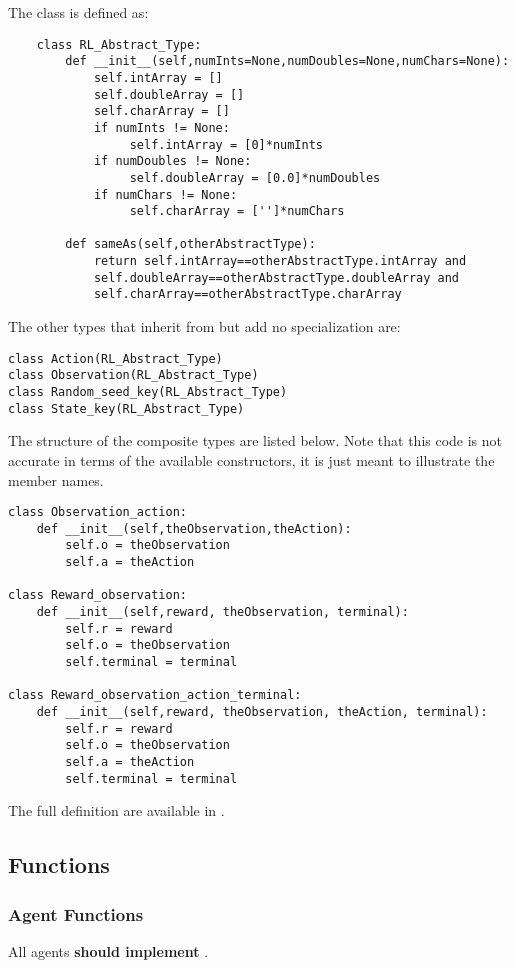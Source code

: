 \documentclass[11pt]{article}
\begin{document}
The class is defined as:
\begin{verbatim}
    class RL_Abstract_Type:
        def __init__(self,numInts=None,numDoubles=None,numChars=None):
            self.intArray = []
            self.doubleArray = []
            self.charArray = []
            if numInts != None:
                 self.intArray = [0]*numInts
            if numDoubles != None:
                 self.doubleArray = [0.0]*numDoubles
            if numChars != None:
                 self.charArray = ['']*numChars

        def sameAs(self,otherAbstractType):
            return self.intArray==otherAbstractType.intArray and
            self.doubleArray==otherAbstractType.doubleArray and 
            self.charArray==otherAbstractType.charArray
\end{verbatim}

The other types that inherit from \texttt{\rat} but add no specialization are:
\begin{verbatim}
class Action(RL_Abstract_Type)
class Observation(RL_Abstract_Type)
class Random_seed_key(RL_Abstract_Type)
class State_key(RL_Abstract_Type)
\end{verbatim}

The structure of the composite types are listed below.  Note that this code is not accurate in terms of the available constructors, 
it is just meant to illustrate the member names.
\begin{verbatim}
class Observation_action:
    def __init__(self,theObservation,theAction):
        self.o = theObservation
        self.a = theAction

class Reward_observation:
    def __init__(self,reward, theObservation, terminal):
        self.r = reward
        self.o = theObservation
        self.terminal = terminal

class Reward_observation_action_terminal:
    def __init__(self,reward, theObservation, theAction, terminal):
        self.r = reward
        self.o = theObservation
        self.a = theAction
        self.terminal = terminal
\end{verbatim}

The full definition are available in .
\subsection{Functions}
\subsubsection{Agent Functions}
All agents \textbf{should implement} .
\end{document}
